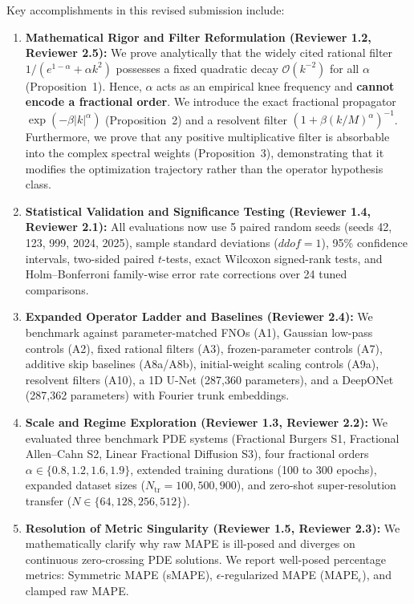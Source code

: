 \documentclass[11pt,a4paper]{article}
\begin{document}
Key accomplishments in this revised submission include:
\begin{enumerate}
  \item \textbf{Mathematical Rigor and Filter Reformulation (Reviewer 1.2, Reviewer 2.5):} We prove analytically that the widely cited rational filter $1/(e^{1-\alpha} + \alpha k^2)$ possesses a fixed quadratic decay $\mathcal{O}(k^{-2})$ for all $\alpha$ (Proposition~1). Hence, $\alpha$ acts as an empirical knee frequency and \textbf{cannot encode a fractional order}. We introduce the exact fractional propagator $\exp(-\beta|k|^\alpha)$ (Proposition~2) and a resolvent filter $(1+\beta(k/M)^\alpha)^{-1}$. Furthermore, we prove that any positive multiplicative filter is absorbable into the complex spectral weights (Proposition~3), demonstrating that it modifies the optimization trajectory rather than the operator hypothesis class.
  \item \textbf{Statistical Validation and Significance Testing (Reviewer 1.4, Reviewer 2.1):} All evaluations now use 5 paired random seeds (seeds 42, 123, 999, 2024, 2025), sample standard deviations ($ddof=1$), 95\% confidence intervals, two-sided paired $t$-tests, exact Wilcoxon signed-rank tests, and Holm--Bonferroni family-wise error rate corrections over 24 tuned comparisons.
  \item \textbf{Expanded Operator Ladder and Baselines (Reviewer 2.4):} We benchmark against parameter-matched FNOs (A1), Gaussian low-pass controls (A2), fixed rational filters (A3), frozen-parameter controls (A7), additive skip baselines (A8a/A8b), initial-weight scaling controls (A9a), resolvent filters (A10), a 1D U-Net (287,360 parameters), and a DeepONet (287,362 parameters) with Fourier trunk embeddings.
  \item \textbf{Scale and Regime Exploration (Reviewer 1.3, Reviewer 2.2):} We evaluated three benchmark PDE systems (Fractional Burgers S1, Fractional Allen--Cahn S2, Linear Fractional Diffusion S3), four fractional orders $\alpha \in \{0.8, 1.2, 1.6, 1.9\}$, extended training durations (100 to 300 epochs), expanded dataset sizes ($N_{\mathrm{tr}} = 100, 500, 900$), and zero-shot super-resolution transfer ($N \in \{64, 128, 256, 512\}$).
  \item \textbf{Resolution of Metric Singularity (Reviewer 1.5, Reviewer 2.3):} We mathematically clarify why raw MAPE is ill-posed and diverges on continuous zero-crossing PDE solutions. We report well-posed percentage metrics: Symmetric MAPE (sMAPE), $\epsilon$-regularized MAPE ($\text{MAPE}_\epsilon$), and clamped raw MAPE.

\end{enumerate}
\end{document}
